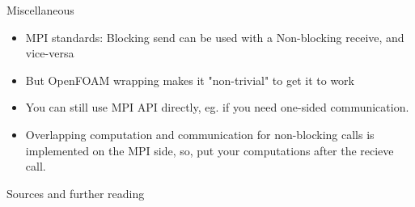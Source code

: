 \begin{frame}[fragile]{Miscellaneous}
    \begin{itemize}
        \item MPI standards: Blocking send can be used with a Non-blocking receive, and vice-versa
        \item But OpenFOAM wrapping makes it "non-trivial" to get it to work
    \end{itemize}
    \begin{itemize}
        \item You can still use MPI API directly, eg.  if you need one-sided communication.
    \end{itemize}
    \begin{itemize}
        \item Overlapping computation and communication for non-blocking calls is implemented on the MPI side, so,
        put your computations after the recieve call.
    \end{itemize}
\end{frame}


\begin{frame}[allowframebreaks]{Sources and further reading}
\printbibliography[heading=none]
\end{frame}
